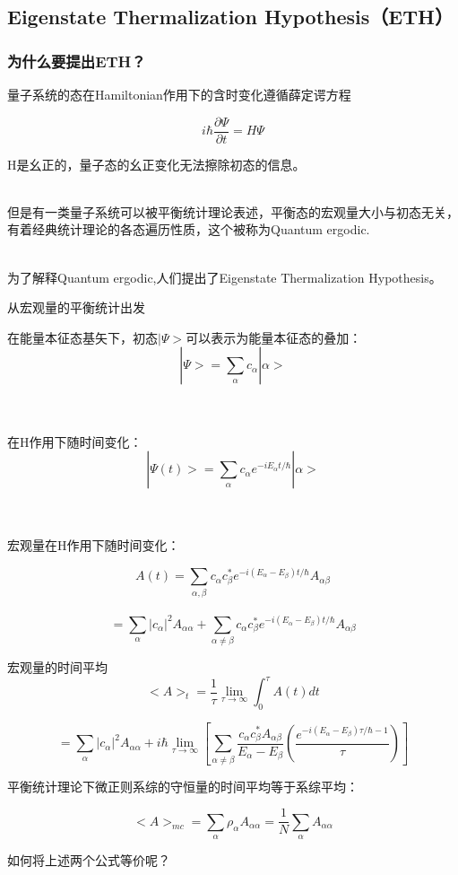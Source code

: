 \documentclass{beamer}
\begin{document}
\subsection{Eigenstate Thermalization Hypothesis（ETH）}
\begin{frame}
\frametitle{为什么要提出ETH？}
量子系统的态在Hamiltonian作用下的含时变化遵循薛定谔方程

$$ i \hbar\frac{\partial \Psi}{\partial t}=H\Psi$$

\pause H是幺正的，量子态的幺正变化无法擦除初态的信息。
\\~

\pause 但是有一类量子系统可以被平衡统计理论表述，平衡态的宏观量大小与初态无关，有着经典统计理论的各态遍历性质，这个被称为Quantum ergodic.
\\~

\pause 为了解释Quantum ergodic,人们提出了Eigenstate Thermalization Hypothesis。

\end{frame}

\begin{frame}{从宏观量的平衡统计出发}

在能量本征态基矢下，初态$|\Psi>$可以表示为能量本征态的叠加：
$$|\Psi>=\sum_{\alpha}c_{\alpha}|\alpha>$$
\\~

在H作用下随时间变化：
$$|\Psi(t)>=\sum_{\alpha}c_{\alpha}e^{-i E_\alpha t/\hbar}|\alpha>$$
\\~

宏观量在H作用下随时间变化：


$$A(t)=\sum_{\alpha,\beta}c_{\alpha}c_{\beta}^{*}e^{-i(E_\alpha-E_\beta) t/\hbar}A_{\alpha \beta}$$\\

$$=\sum_{\alpha}|c_{\alpha}|^{2}A_{\alpha \alpha}+\sum_{\alpha \ne \beta}c_{\alpha}c_{\beta}^{*}e^{-i(E_\alpha-E_\beta) t/\hbar}A_{\alpha \beta}$$
\end{frame}

\begin{frame}
宏观量的时间平均
$$<A>_t=\frac{1}{\tau}\lim_{\tau \to \infty}\int_{0}^{\tau}A(t)dt $$

$$=\sum_{\alpha}|c_{\alpha}|^{2}A_{\alpha \alpha}+i\hbar\lim_{\tau\to \infty}[\sum_{\alpha\ne\beta}\frac{c_{\alpha}c_{\beta}^{*}A_{\alpha \beta}}{E_\alpha-E_\beta}(\frac{e^{-i(E_\alpha-E_\beta)\tau/\hbar-1}}{\tau})]$$

平衡统计理论下微正则系综的守恒量的时间平均等于系综平均：

$$<A>_{mc}=\sum_{\alpha}{\rho_\alpha A_{\alpha\alpha}}=\frac{1}{N}\sum_{\alpha}{A_{\alpha\alpha}}$$

\pause 如何将上述两个公式等价呢？

\end{frame}
\end{document}
